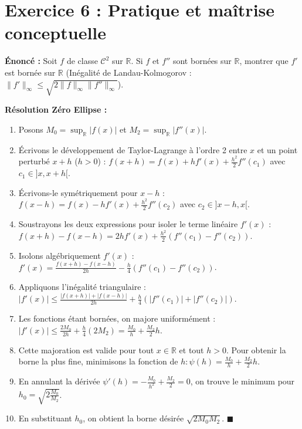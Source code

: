 \documentclass[11pt,a4paper]{article}
\begin{document}
\vspace{1em}

\section*{Exercice 6 : Pratique et maîtrise conceptuelle}

\textbf{Énoncé :}
Soit $f$ de classe $\mathcal{C}^2$ sur $\mathbb{R}$. Si $f$ et $f''$ sont bornées sur $\mathbb{R}$, montrer que $f'$ est bornée sur $\mathbb{R}$ (Inégalité de Landau-Kolmogorov : $\|f'\|_\infty \leq \sqrt{2 \|f\|_\infty \|f''\|_\infty}$).

\textbf{Résolution Zéro Ellipse :}
\begin{enumerate}
\item Posons $M_0 = \sup_{\mathbb{R}} |f(x)|$ et $M_2 = \sup_{\mathbb{R}} |f''(x)|$.
\item Écrivons le développement de Taylor-Lagrange à l'ordre 2 entre $x$ et un point perturbé $x+h$ ($h > 0$) :
   $f(x+h) = f(x) + h f'(x) + \frac{h^2}{2} f''(c_1)$ avec $c_1 \in ]x, x+h[$.
\item Écrivons-le symétriquement pour $x-h$ :
   $f(x-h) = f(x) - h f'(x) + \frac{h^2}{2} f''(c_2)$ avec $c_2 \in ]x-h, x[$.
\item Soustrayons les deux expressions pour isoler le terme linéaire $f'(x)$ :
   $f(x+h) - f(x-h) = 2h f'(x) + \frac{h^2}{2} (f''(c_1) - f''(c_2))$.
\item Isolons algébriquement $f'(x)$ :
   $f'(x) = \frac{f(x+h) - f(x-h)}{2h} - \frac{h}{4} (f''(c_1) - f''(c_2))$.
\item Appliquons l'inégalité triangulaire :
   $|f'(x)| \leq \frac{|f(x+h)| + |f(x-h)|}{2h} + \frac{h}{4} (|f''(c_1)| + |f''(c_2)|)$.
\item Les fonctions étant bornées, on majore uniformément :
   $|f'(x)| \leq \frac{2M_0}{2h} + \frac{h}{4} (2M_2) = \frac{M_0}{h} + \frac{M_2}{2} h$.
\item Cette majoration est valide pour tout $x \in \mathbb{R}$ et tout $h > 0$. Pour obtenir la borne la plus fine, minimisons la fonction de $h : \psi(h) = \frac{M_0}{h} + \frac{M_2}{2} h$.
\item En annulant la dérivée $\psi'(h) = -\frac{M_0}{h^2} + \frac{M_2}{2} = 0$, on trouve le minimum pour $h_0 = \sqrt{2 \frac{M_0}{M_2}}$.
\item En substituant $h_0$, on obtient la borne désirée $\sqrt{2 M_0 M_2}$. $\blacksquare$
\end{enumerate}
\end{document}
